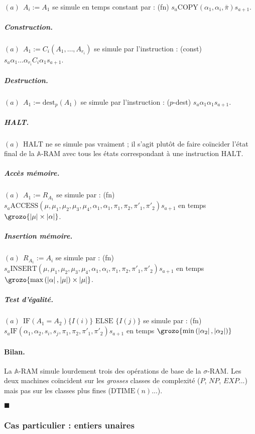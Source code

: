 \documentclass{article}
\newcommand{\sRAMifc}[2]{\text{IF} (A_1=A_2) \{I( #1 )\} \text{ ELSE } \{I( #2 )\}}
\newcommand{\bbA}{\mathbb{A}}
\begin{document}
\begin{demo}
					$(a) \:\: A_i := A_1$ se simule en temps constant par : (fn) $s_a \text{COPY}(\alpha_1, \alpha_i, \bar{\pi}) s_{a+1}$.
				
					\subparagraph{Construction.}
					$(a) \:\: A_1 := C_i(A_1, \dots, A_{r_i})$ se simule par l'instruction : (const) $s_a \alpha_1 \dots \alpha_{r_i} C_i \alpha_1 s_{a+1}$.
					
					\subparagraph{Destruction.}
					$(a) \:\: A_1 := \text{dest}_p(A_1)$ se simule par l'instruction : ($p$-dest) $s_a \alpha_1 \alpha_1 s_{a+1}$.
					
					\subparagraph{HALT.}
					$(a) \:\: \text{HALT}$ ne se simule pas vraiment ; il s'agit plutôt de faire coïncider l'état final de la $\bbA$-RAM avec tous les états correspondant à une instruction $\text{HALT}$. 
					
					\subparagraph{Accès mémoire.}
					$(a) \:\: A_1 := R_{A_1}$ se simule par : (fn) $s_a \text{ACCESS}\left( \mu, \mu_1, \mu_2, \mu_3, \mu_4, \alpha_1, \alpha_1, \pi_1, \pi_2, \pi'_1, \pi'_2\right) s_{a+1}$ en temps $\grozo{\left| \mu \right| \times \left| \alpha \right|}$.
					
					\subparagraph{Insertion mémoire.}
					$(a) \:\: R_{A_1} := A_i$ se simule par : (fn) $s_a \text{INSERT}\left( \mu, \mu_1, \mu_2, \mu_3, \mu_4, \alpha_1, \alpha_i, \pi_1, \pi_2, \pi'_1, \pi'_2\right) s_{a+1}$ en temps $\grozo{\max\left( \left| \alpha \right|, \left| \mu \right| \right)\times \left| \mu \right|}$. 
					
					\subparagraph{Test d'égalité.}
					$(a) \:\: \sRAMifc{i}{j}$ se simule par : (fn) $s_a \text{IF}\left( \alpha_1, \alpha_2, s_i, s_j, \pi_1, \pi_2, \pi'_1, \pi'_2 \right) s_{a+1}$ en temps $\grozo{\min\left( \left| \alpha_2\right|, \left| \alpha_2 \right| \right)}$
					
					
				\paragraph{Bilan.}
				La $\bbA$-RAM simule lourdement trois des opérations de base de la $\sigma$-RAM. Les deux machines coïncident sur les \emph{grosses} classes de complexité ($P$, $NP$, $EXP$...) mais pas sur les classes plus fines ($\text{DTIME}(n)$...).
					
				$\blacksquare$
			\end{demo}
			
			
			
			
			\subsubsection{Cas particulier : entiers unaires}
						
\end{document}
